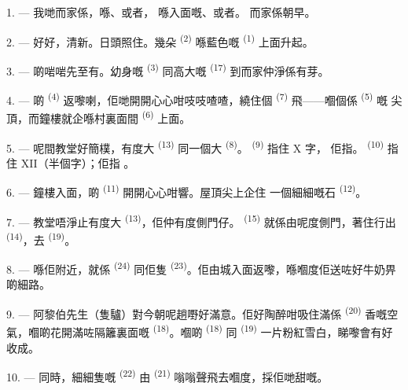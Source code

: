 1. --- 我哋而家係，喺、或者，
喺入面嘅、或者。
而家係朝早。

2. --- 好好，清新。日頭照住。幾朵
\textsuperscript{(2)} 喺藍色嘅 \textsuperscript{(1)} 上面升起。

3. --- 啲啱啱先至有。幼身嘅 \textsuperscript{(3)}
同高大嘅 \textsuperscript{(17)} 到而家仲淨係有芽。

4. --- 啲 \textsuperscript{(4)} 返嚟喇，佢哋開開心心咁吱吱喳喳，繞住個
 \textsuperscript{(7)} 飛——嗰個係 \textsuperscript{(5)} 嘅
尖頂，而鐘樓就企喺村裏面間 \textsuperscript{(6)} 上面。

\VUsaut{3.4mm}
\VUsaut{3.0mm}

5. --- 呢間教堂好簡樸，有度大 \textsuperscript{(13)} 同一個大
 \textsuperscript{(8)}。 \textsuperscript{(9)} 指住 X 字，
佢指。 \textsuperscript{(10)} 指住 XII（半個字）；佢指
。

6. --- 鐘樓入面，啲 \textsuperscript{(11)} 開開心心咁響。屋頂尖上企住
一個細細嘅石 \textsuperscript{(12)}。

7. --- 教堂唔淨止有度大 \textsuperscript{(13)}，佢仲有度側門仔。
 \textsuperscript{(15)} 就係由呢度側門，著住行出
 \textsuperscript{(14)}，去 \textsuperscript{(19)}。

8. --- 喺佢附近，就係 \textsuperscript{(24)} 同佢隻
\textsuperscript{(23)}。佢由城入面返嚟，喺嗰度佢送咗好牛奶畀啲細路。

\VUsaut{4.0mm}
\VUsaut{3.4mm}

9. --- 阿黎伯先生（隻驢）對今朝呢趟嘢好滿意。佢好陶醉咁吸住滿係
\textsuperscript{(20)} 香嘅空氣，嗰啲花開滿咗隔籬裏面嘅
\textsuperscript{(18)}。嗰啲 \textsuperscript{(18)} 同 \textsuperscript{(19)}
一片粉紅雪白，睇嚟會有好收成。

10. --- 同時，細細隻嘅 \textsuperscript{(22)} 由
\textsuperscript{(21)} 嗡嗡聲飛去嗰度，採佢哋甜嘅。

